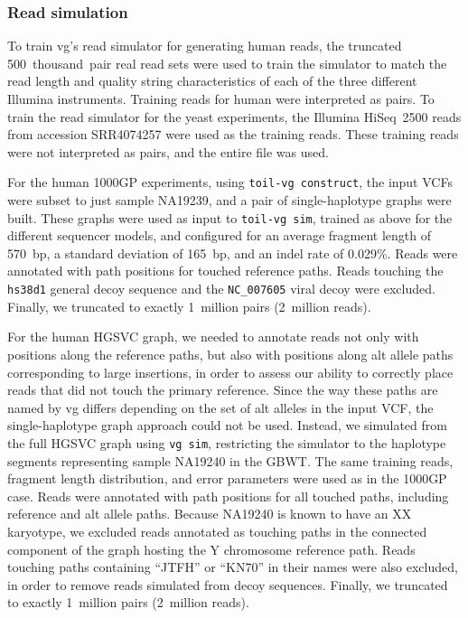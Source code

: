 \documentclass[11pt]{ucscthesis}
\begin{document}
\subsubsection{Read simulation}
\label{subsec:aim2:readsim}

To train vg's read simulator for generating human reads, the truncated 500~thousand~pair real read sets were used to train the simulator to match the read length and quality string characteristics of each of the three different Illumina instruments.
Training reads for human were interpreted as pairs.
To train the read simulator for the yeast experiments, the Illumina HiSeq~2500 reads from accession SRR4074257 were used as the training reads.
These training reads were not interpreted as pairs, and the entire file was used.


For the human 1000GP experiments, using \texttt{toil-vg~construct}, the input VCFs were subset to just sample NA19239, and a pair of single-haplotype graphs were built.
These graphs were used as input to \texttt{toil-vg~sim}, trained as above for the different sequencer models, and configured for an average fragment length of 570~bp, a standard deviation of 165~bp, and an indel rate of 0.029\%.
Reads were annotated with path positions for touched reference paths.
Reads touching the \texttt{hs38d1} general decoy sequence and the \texttt{NC\_007605} viral decoy were excluded.
Finally, we truncated to exactly 1~million pairs (2~million reads).

For the human HGSVC graph, we needed to annotate reads not only with positions along the reference paths, but also with positions along alt allele paths corresponding to large insertions, in order to assess our ability to correctly place reads that did not touch the primary reference.
Since the way these paths are named by vg differs depending on the set of alt alleles in the input VCF, the single-haplotype graph approach could not be used.
Instead, we simulated from the full HGSVC graph using \texttt{vg~sim}, restricting the simulator to the haplotype segments representing sample NA19240 in the GBWT.
The same training reads, fragment length distribution, and error parameters were used as in the 1000GP case.
Reads were annotated with path positions for all touched paths, including reference and alt allele paths.
Because NA19240 is known to have an XX karyotype, we excluded reads annotated as touching paths in the connected component of the graph hosting the Y chromosome reference path.
Reads touching paths containing ``JTFH'' or ``KN70'' in their names were also excluded, in order to remove reads simulated from decoy sequences.
Finally, we truncated to exactly 1~million pairs (2~million reads).
\end{document}
